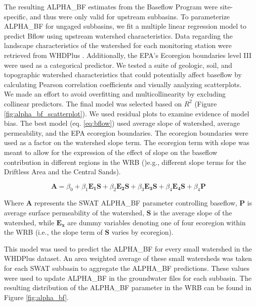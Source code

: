 	The resulting ALPHA\_BF estimates from the Baseflow Program were site-specific, and thus were only valid for upstream subbasins. To parameterize ALPHA\_BF for ungaged subbasins, we fit a multiple linear regression model to predict Bflow using upstream watershed characteristics. 
	Data regarding the landscape characteristics of the watershed for each monitoring station were retrieved from WHDPlus \citep{wdnr_whdplus_2013}.
	Additionally, the EPA's Ecoregion boundaries level III were used as a categorical predictor. 
	We tested a suite of geologic, soil, and topographic watershed characteristics that could potentially affect baseflow by calculating Pearson correlation coefficients and visually analyzing scatterplots.
	We made an effort to avoid overfitting and multicollinearity by excluding collinear predictors. The final model was selected based on $R^2$ (Figure \ref{fig:alpha_bf_scatterplot}). 
	We used residual plots to examine evidence of model bias. 
	The best model (eq. \ref{eq:bflow}) used average slope of watershed, average permeability, and the EPA ecoregion boundaries. The ecoregion boundaries were used as a factor on the watershed slope term. 
	The ecoregion term with slope was meant to allow for the expression of the effect of slope on the baseflow contribution in different regions in the WRB ()e.g., different slope terms for the Driftless Area and the Central Sands).

	\begin{equation}
	\bm{A} = \beta_0 + 
		\beta_1 \bm{E_1} \bm{S} +
		\beta_2 \bm{E_2} \bm{S} + 
		\beta_3 \bm{E_3} \bm{S} +
		\beta_4 \bm{E_4} \bm{S} +
		\beta_4 \bm{P}
		\label{eq:bflow}
	\end{equation}
	
	Where $\bm{A}$ represents the SWAT ALPHA\_BF parameter controlling baseflow, $\bm{P}$ is average surface permeability of the watershed, $\bm{S}$ is the average slope of the watershed, while $\bm{E_x}$ are dummy variables denoting one of four ecoregion within the WRB (i.e., the slope term of $\bm{S}$ varies by ecoregion).
	
	This model was used to predict the ALPHA\_BF for every small watershed in the WHDPlus dataset. An area weighted average of these small watersheds was taken for each SWAT subbasin to aggregate the ALPHA\_BF predictions. These values were used to update ALPHA\_BF in the groundwater files for each subbasin. The resulting distribution of the ALPHA\_BF parameter in the WRB can be found in Figure \ref{fig:alpha_bf}.
	